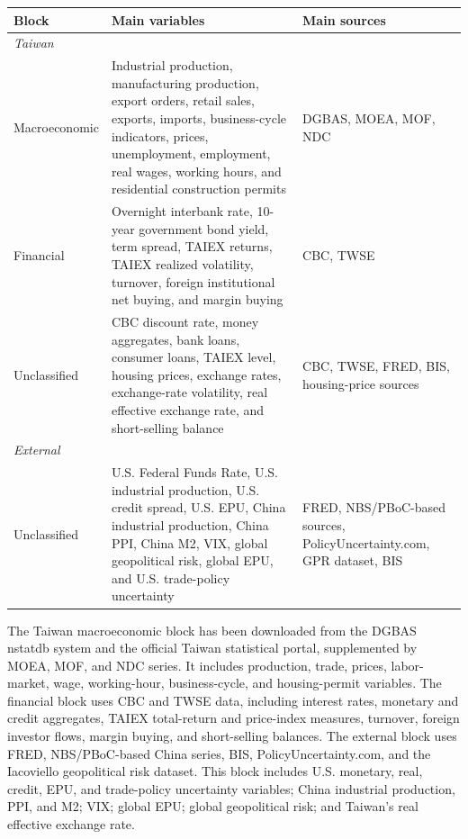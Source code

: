 \documentclass[12pt]{article}
\begin{document}
\begin{center}
\begin{tabular}{p{}p{}p{}}
\toprule
Block & Main variables & Main sources \\
\midrule
\textit{Taiwan} \\[0.3em]
Macroeconomic &
Industrial production, manufacturing production, export orders, retail sales, exports, imports,
business-cycle indicators, prices, unemployment, employment, real wages, working hours, and
residential construction permits &
DGBAS, MOEA, MOF, NDC \\
\addlinespace
Financial &
Overnight interbank rate, 10-year government bond yield, term spread, TAIEX returns,
TAIEX realized volatility, turnover, foreign institutional net buying, and margin buying &
CBC, TWSE \\
\addlinespace
Unclassified &
CBC discount rate, money aggregates, bank loans, consumer loans, TAIEX level, housing prices,
exchange rates, exchange-rate volatility, real effective exchange rate, and short-selling balance &
CBC, TWSE, FRED, BIS, housing-price sources \\
\addlinespace
\textit{External} \\[0.3em]
Unclassified &
U.S. Federal Funds Rate, U.S. industrial production, U.S. credit spread, U.S. EPU, China
industrial production, China PPI, China M2, VIX, global geopolitical risk, global EPU, and
U.S. trade-policy uncertainty &
FRED, NBS/PBoC-based sources, PolicyUncertainty.com, GPR dataset, BIS \\
\bottomrule
\end{tabular}
\end{center}

The Taiwan macroeconomic block has been downloaded from the DGBAS nstatdb system and the
official Taiwan statistical portal, supplemented by MOEA, MOF, and NDC series. It includes
production, trade, prices, labor-market, wage, working-hour, business-cycle, and housing-permit
variables. The financial block uses CBC and TWSE data, including interest rates, monetary and
credit aggregates, TAIEX total-return and price-index measures, turnover, foreign investor flows,
margin buying, and short-selling balances. The external block uses FRED, NBS/PBoC-based China
series, BIS, PolicyUncertainty.com, and the Iacoviello geopolitical risk dataset. This block includes
U.S. monetary, real, credit, EPU, and trade-policy uncertainty variables; China industrial
production, PPI, and M2; VIX; global EPU; global geopolitical risk; and Taiwan's real effective
exchange rate.
\end{document}
